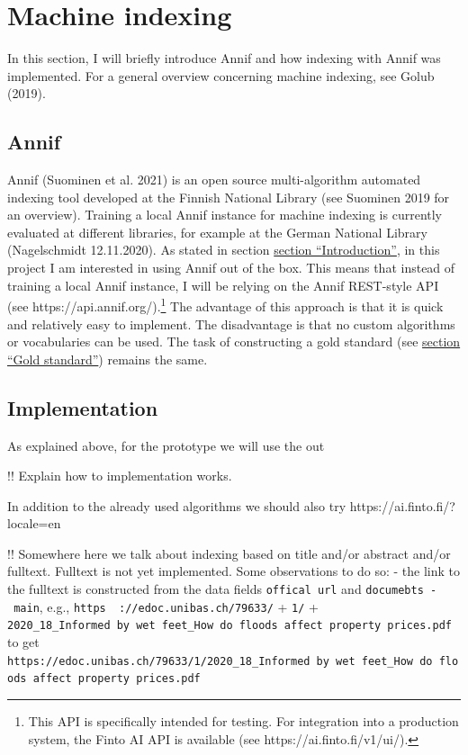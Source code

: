\hypertarget{machine-indexing}{%
\section{Machine indexing}\label{machine-indexing}}

In this section, I will briefly introduce Annif and how indexing with
Annif was implemented. For a general overview concerning machine
indexing, see Golub (2019).

\hypertarget{annif}{%
\subsection{Annif}\label{annif}}

Annif (Suominen et al. 2021) is an open source multi-algorithm automated
indexing tool developed at the Finnish National Library (see Suominen
2019 for an overview). Training a local Annif instance for machine
indexing is currently evaluated at different libraries, for example at
the German National Library (Nagelschmidt 12.11.2020). As stated in
section \protect\hyperlink{introduction}{section ``Introduction''}, in
this project I am interested in using Annif out of the box. This means
that instead of training a local Annif instance, I will be relying on
the Annif REST-style API (see https://api.annif.org/).\footnote{This API
  is specifically intended for testing. For integration into a
  production system, the Finto AI API is available (see
  https://ai.finto.fi/v1/ui/).} The advantage of this approach is that
it is quick and relatively easy to implement. The disadvantage is that
no custom algorithms or vocabularies can be used. The task of
constructing a gold standard (see
\protect\hyperlink{gold-standard}{section ``Gold standard''}) remains
the same.

\hypertarget{implementation}{%
\subsection{Implementation}\label{implementation}}

As explained above, for the prototype we will use the out

!! Explain how to implementation works.

In addition to the already used algorithms we should also try
https://ai.finto.fi/?locale=en

!! Somewhere here we talk about indexing based on title and/or abstract
and/or fulltext. Fulltext is not yet implemented. Some observations to
do so: - the link to the fulltext is constructed from the data fields
\texttt{offical\ url} and \texttt{documebts\ -\ main}, e.g.,
\texttt{https\ \ ://edoc.unibas.ch/79633/} + \texttt{1/} +
\texttt{2020\_18\_Informed\ by\ wet\ feet\_How\ do\ floods\ affect\ property\ prices.pdf}
to get
\texttt{https://edoc.unibas.ch/79633/1/2020\_18\_Informed\ by\ wet\ feet\_How\ do\ floods\ affect\ property\ prices.pdf}

